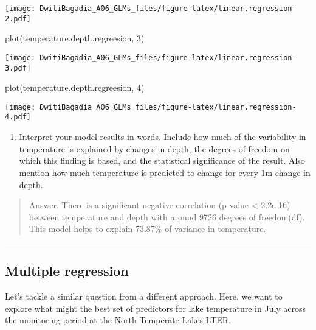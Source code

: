 \documentclass[
]{article}
\newenvironment{Shaded}{\begin{snugshade}}{\end{snugshade}}
\newcommand{\DecValTok}[1]{\textcolor[rgb]{0.00,0.00,0.81}{#1}}
\newcommand{\FunctionTok}[1]{\textcolor[rgb]{0.00,0.00,0.00}{#1}}
\newcommand{\NormalTok}[1]{#1}
\providecommand{\tightlist}{%
  \setlength{\itemsep}{0pt}\setlength{\parskip}{0pt}}
\begin{document}
\texttt{[image: DwitiBagadia\_A06\_GLMs\_files/figure-latex/linear.regression-2.pdf]}

\begin{Shaded}
\begin{Highlighting}[]
\FunctionTok{plot}\NormalTok{(temperature.depth.regreesion, }\DecValTok{3}\NormalTok{)}
\end{Highlighting}
\end{Shaded}

\texttt{[image: DwitiBagadia\_A06\_GLMs\_files/figure-latex/linear.regression-3.pdf]}

\begin{Shaded}
\begin{Highlighting}[]
\FunctionTok{plot}\NormalTok{(temperature.depth.regreesion, }\DecValTok{4}\NormalTok{)}
\end{Highlighting}
\end{Shaded}

\texttt{[image: DwitiBagadia\_A06\_GLMs\_files/figure-latex/linear.regression-4.pdf]}

\begin{enumerate}
\def\labelenumi{\arabic{enumi}.}
\setcounter{enumi}{7}
\tightlist
\item
  Interpret your model results in words. Include how much of the
  variability in temperature is explained by changes in depth, the
  degrees of freedom on which this finding is based, and the statistical
  significance of the result. Also mention how much temperature is
  predicted to change for every 1m change in depth.
\end{enumerate}

\begin{quote}
Answer: There is a significant negative correlation (p value \textless{}
2.2e-16) between temperature and depth with around 9726 degrees of
freedom(df). This model helps to explain 73.87\% of variance in
temperature.
\end{quote}

\begin{center}\rule{0.5\linewidth}{0.5pt}\end{center}

\hypertarget{multiple-regression}{%
\subsection{Multiple regression}\label{multiple-regression}}

Let's tackle a similar question from a different approach. Here, we want
to explore what might the best set of predictors for lake temperature in
July across the monitoring period at the North Temperate Lakes LTER.
\end{document}
